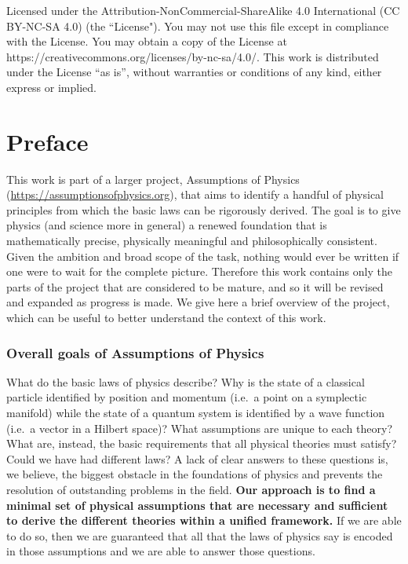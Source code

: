 \documentclass[11pt,letterpaper,fleqn]{memoir} %
\begin{document}
\vspace{12pt}

\noindent Licensed under the Attribution-NonCommercial-ShareAlike 4.0 International (CC BY-NC-SA 4.0) (the ``License"). You may not use this file except in compliance with the License. You may obtain a copy of the License at https://creativecommons.org/licenses/by-nc-sa/4.0/. This work is distributed under the License ``as is'', without warranties or conditions of any kind, either express or implied.

\chapter{Preface}

This work is part of a larger project, Assumptions of Physics (\url{https://assumptionsofphysics.org}), that aims to identify a handful of physical principles from which the basic laws can be rigorously derived. The goal is to give physics (and science more in general) a renewed foundation that is mathematically precise, physically meaningful and philosophically consistent. Given the ambition and broad scope of the task, nothing would ever be written if one were to wait for the complete picture. Therefore this work contains only the parts of the project that are considered to be mature, and so it will be revised and expanded as progress is made. We give here a brief overview of the project, which can be useful to better understand the context of this work.

\subsection{Overall goals of Assumptions of Physics}

What do the basic laws of physics describe? Why is the state of a classical particle identified by position and momentum (i.e.~a point on a symplectic manifold) while the state of a quantum system is identified by a wave function (i.e.~a vector in a Hilbert space)? What assumptions are unique to each theory? What are, instead, the basic requirements that all physical theories must satisfy? Could we have had different laws? A lack of clear answers to these questions is, we believe, the biggest obstacle in the foundations of physics and prevents the resolution of outstanding problems in the field. \textbf{Our approach is to find a minimal set of physical assumptions that are necessary and sufficient to derive the different theories within a unified framework.} If we are able to do so, then we are guaranteed that all that the laws of physics say is encoded in those assumptions and we are able to answer those questions.
\end{document}

